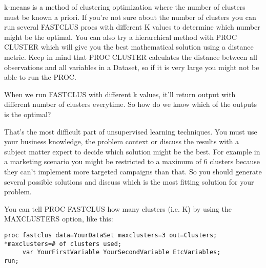 \documentclass[a4paper,12pt]{article}
\begin{document}
\newpage

k-means is a method of clustering optimization where the number of clusters must be known a priori. If you're not sure about the number of clusters you can run several FASTCLUS procs with different K values to determine which number might be the optimal. You can also try a hierarchical method with PROC CLUSTER which will give you the best mathematical solution using a distance metric. Keep in mind that PROC CLUSTER calculates the distance between all observations and all variables in a Dataset, so if it is very large you might not be able to run the PROC. 

When we run FASTCLUS with different k values, it'll return output with different number of clusters everytime. So how do we know which of the outputs is the optimal?

That's the most difficult part of unsupervised learning techniques. You must use your business knowledge, the 
problem context or discuss the results with a subject matter expert to decide which solution might be the best. 
For example in a marketing scenario you might be restricted to a maximum of 6 clusters because they can't implement 
more targeted campaigns than that. So you should generate several possible solutions and discuss which is the most 
fitting solution for your problem.

You can tell PROC FASTCLUS how many clusters (i.e. K) by using the MAXCLUSTERS option, like this:
\begin{framed}
	\begin{verbatim}
proc fastclus data=YourDataSet maxclusters=3 out=Clusters; 
*maxclusters=# of clusters used;
     var YourFirstVariable YourSecondVariable EtcVariables;
run;
\end{verbatim}
\end{framed}
\end{document}
